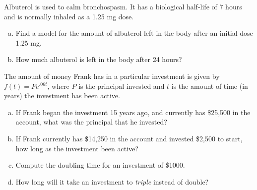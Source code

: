 \documentclass[notes]{subfiles}
\begin{document}
		\begin{ex}
			Albuterol is used to calm bronchospasm.  It has a biological half-life of 7 hours and is normally inhaled as a 1.25 mg dose.
			\begin{enumerate}[(a)]
				\item Find a model for the amount of albuterol left in the body after an initial dose 1.25 mg.
				\item How much albuterol is left in the body after 24 hours?
			\end{enumerate}
		\end{ex}
			\newpage
			
		\begin{ex}
			The amount of money Frank has in a particular investment is given by $f(t) = Pe^{.06t}$, where $P$ is the principal invested and $t$ is the amount of time (in years) the investment has been active.  
			\begin{enumerate}[(a)]
				\item If Frank began the investment 15 years ago, and currently has \$25,500 in the account, what was the principal that he invested?
					\vs{1}
					
				\item If Frank currently has \$14,250 in the account and invested \$2,500 to start, how long as the investment been active?
					\vs{1}
					
				\item Compute the doubling time for an investment of \$1000.
					\vs{1}
					
				\item How long will it take an investment to \emph{triple} instead of double?
					\vs{1}
			\end{enumerate}
		\end{ex}
	\clearpage
\end{document}
